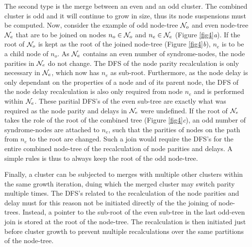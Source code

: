 The second type is the merge between an even and an odd cluster. The combined cluster is odd and it will continue to grow in size, thus its node suspensions must be computed. Now, consider the example of odd node-tree $\mathcal{N}_o$ and even node-tree $\mathcal{N}_e$ that are to be joined on nodes $n_o\in \mathcal{N}_o$ and $n_e \in \mathcal{N}_e$ (Figure \ref{fig4}\emph{a}). If the root of $\mathcal{N}_o$ is kept as the root of the joined node-tree (Figure \ref{fig4}\emph{b}), $n_e$ is to be a child node of $n_o$. As $\mathcal{N}_e$ contains an even number of syndrome-nodes, the node parities in $\mathcal{N}_e$ do not change. The DFS of the node parity recalculation is only necessary in $\mathcal{N}_e$, which now has $n_e$ as sub-root. Furthermore, as the node delay is only dependant on the properties of a node and of its parent node, the DFS of the node delay recalculation is also only required from node $n_e$ and is performed within $\mathcal{N}_e$. These paritial DFS's of the even sub-tree are exactly what was required as the node parity and delays in $\mathcal{N}_e$ were undefined. If the root of $\mathcal{N}_e$ takes the role of the root of the combined tree (Figure \ref{fig4}\emph{c}), an odd number of syndrome-nodes are attached to $n_e$, such that the parities of nodes on the path from $n_e$ to the root are changed. Such a join would require the DFS's for the entire combined node-tree of the recalculation of node parities and delays. A simple rules is thus to always keep the root of the odd node-tree. 

Finally, a cluster can be subjected to merges with multiple other clusters within the same growth iteration, duing which the merged cluster may switch parity multiple times. The DFS's related to the recalculation of the node parities and delay must for this reason not be initiated directly of the the joining of node-trees. Instead, a pointer to the sub-root of the even sub-tree in the last odd-even join is stored at the root of the node-tree. The recalculation is then initiated just before cluster growth to prevent multiple recalculations over the same partitions of the node-tree. 




